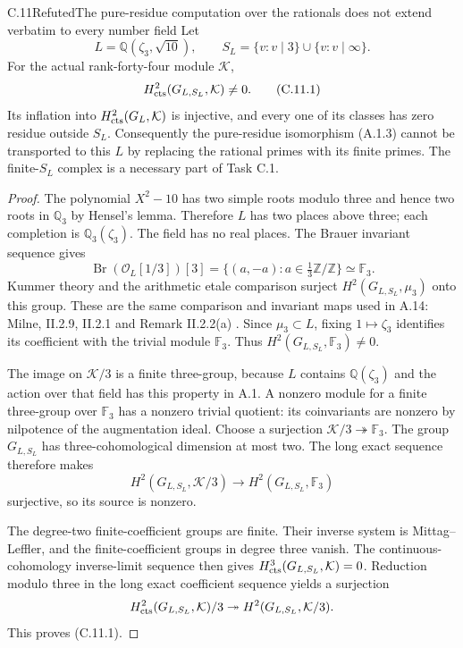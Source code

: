 \begin{statement}{C.11}{Refuted}{The pure-residue computation over the rationals does not extend verbatim to every number field}
Let
\[
       L=\mathbb Q(\zeta_3,\sqrt{10}),\qquad
       S_L=\{v:v\mid3\}\cup\{v:v\mid\infty\}.
\]
For the actual rank-forty-four module $\mathcal K$,
\[
                   H^2_{\rm cts}(G_{L,S_L},\mathcal K)\ne0.
                                                               \tag{C.11.1}
\]
Its inflation into $H^2_{\rm cts}(G_L,\mathcal K)$ is
injective, and every one of its classes has zero
residue outside $S_L$.
Consequently the pure-residue isomorphism (A.1.3)
cannot be transported to this $L$ by replacing the
rational primes with its finite primes.  The
finite-$S_L$ complex is a necessary part of Task C.1.
\end{statement}
\begin{proof}
The polynomial $X^2-10$ has two simple roots modulo
three and hence two roots in $\mathbb Q_3$ by Hensel's
lemma.  Therefore $L$ has two places above three;
each completion is $\mathbb Q_3(\zeta_3)$.
The field has no real places.  The Brauer invariant
sequence gives
\[
 \operatorname{Br}(\mathcal O_L[1/3])[3]
   =\{(a,-a):a\in\tfrac13\mathbb Z/\mathbb Z\}
   \simeq\mathbb F_3.                                      \tag{C.11.2}
\]
Kummer theory and the arithmetic etale comparison
surject $H^2(G_{L,S_L},\mu_3)$ onto this group.
These are the same comparison and invariant maps
used in A.14: Milne, II.2.9, II.2.1 and
Remark II.2.2(a) \cite{MilneADT}.  Since $\mu_3\subset L$,
fixing $1\mapsto\zeta_3$ identifies its coefficient with
the trivial module $\mathbb F_3$.  Thus
$H^2(G_{L,S_L},\mathbb F_3)\ne0$.

The image on $\mathcal K/3$ is a finite three-group,
because $L$ contains $\mathbb Q(\zeta_3)$ and the
action over that field has this property in A.1.
A nonzero module for a finite three-group over
$\mathbb F_3$ has a nonzero trivial quotient: its
coinvariants are nonzero by nilpotence of the
augmentation ideal.  Choose a surjection
$\mathcal K/3\twoheadrightarrow\mathbb F_3$.
The group $G_{L,S_L}$ has three-cohomological
dimension at most two.  The long exact sequence
therefore makes
\[
 H^2(G_{L,S_L},\mathcal K/3)
          \longrightarrow H^2(G_{L,S_L},\mathbb F_3)
\]
surjective, so its source is nonzero.

The degree-two finite-coefficient groups are finite.
Their inverse system is Mittag--Leffler, and the
finite-coefficient groups in degree three vanish.
The continuous-cohomology inverse-limit sequence
then gives $H^3_{\rm cts}(G_{L,S_L},\mathcal K)=0$.
Reduction modulo three in the long exact coefficient
sequence yields a surjection
\[
 H^2_{\rm cts}(G_{L,S_L},\mathcal K)/3
          \twoheadrightarrow H^2(G_{L,S_L},\mathcal K/3).
\]
This proves (C.11.1).


\end{proof}
